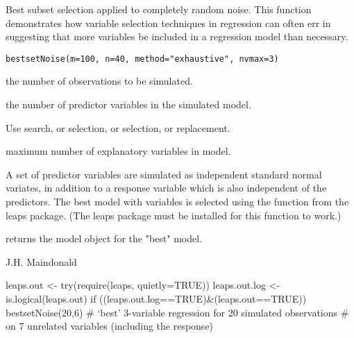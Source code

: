 \begin{Description}\relax
Best subset selection applied to completely random noise.  This
function demonstrates how variable selection techniques in 
regression can often err in suggesting that more variables be
included in a regression model than necessary.
\end{Description}
\begin{Usage}
\begin{verbatim}
bestsetNoise(m=100, n=40, method="exhaustive", nvmax=3)
\end{verbatim}
\end{Usage}
\begin{Arguments}
\begin{ldescription}
\item[\code{m}] the number of observations to be simulated. 
\item[\code{n}] the number of predictor variables in the simulated
model. 
\item[\code{method}] Use  search, or  selection, 
or  selection, or  replacement.
\item[\code{nvmax}] maximum number of explanatory variables in model.
\end{ldescription}
\end{Arguments}
\begin{Details}\relax
A set of  predictor variables are simulated as independent
standard normal variates, in addition to a response variable which
is also independent of the predictors.  The best model with
 variables is selected using the 
function from the leaps package.  (The leaps package must be installed
for this function to work.)
\end{Details}
\begin{Value}
 returns the  model object for the "best"
model.
\end{Value}
\begin{Author}\relax
J.H. Maindonald
\end{Author}
\begin{SeeAlso}\relax
{}
\end{SeeAlso}
\begin{Examples}
\begin{ExampleCode}
leaps.out <- try(require(leaps, quietly=TRUE))
leaps.out.log <- is.logical(leaps.out)
if ((leaps.out.log==TRUE)&(leaps.out==TRUE))
bestsetNoise(20,6) # `best' 3-variable regression for 20 simulated observations 
                   # on 7 unrelated variables (including the response)
\end{ExampleCode}
\end{Examples}


